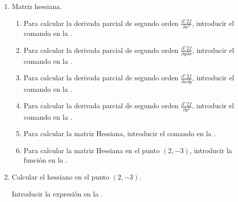 \begin{enumerate}[leftmargin=*]
\begin{enumerate}
      \item Matriz hessiana.
            \begin{indication}
            \begin{enumerate}
            \item Para calcular la derivada parcial de segundo orden $\frac{\partial\^2 f}{\partial x^2}$, introducir el comando  en la .
            \item Para calcular la derivada parcial de segundo orden $\frac{\partial\^2 f}{\partial y\partial x}$, introducir el comando  en la .
            \item Para calcular la derivada parcial de segundo orden $\frac{\partial\^2 f}{\partial x\partial y}$, introducir el comando  en la .
            \item Para calcular la derivada parcial de segundo orden $\frac{\partial\^2 f}{\partial y^2}$, introducir el comando  en la .
            \item Para calcular la matriz Hessiana, introducir el comando  en la .
            \item Para calcular la matriz Hessiana en el punto $(2,-3)$, introducir la función  en la .
            \end{enumerate}
            \end{indication}

      \item Calcular el hessiano en el punto $(2,-3)$.
            \begin{indication}
            Introducir la expresión  en la .
            \end{indication}
      \end{enumerate}



\end{enumerate}
